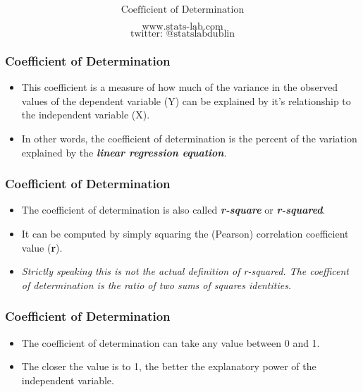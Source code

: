 \documentclass{beamer}
\begin{document}
\begin{frame}

{
\Huge
\[\mbox{Coefficient of Determination} \]
}
{
\Large

\[\mbox{www.stats-lab.com} \]
\[ \mbox{twitter: @statslabdublin} \] 

}
\end{frame}


\begin{frame}
\frametitle{Coefficient of Determination}
\LARGE
\vspace{-1cm}
\begin{itemize}
\item
This coefficient is a measure of how much of the variance in the observed values of the dependent variable (Y) can be explained by it's relationship to the independent variable (X).
\item In other words, the coefficient of determination is the percent of the variation explained by the \textbf{\textit{linear regression equation}}.
\end{itemize}
\end{frame}
\begin{frame}
\frametitle{Coefficient of Determination}
\LARGE
\vspace{-1cm}
\begin{itemize}
\item
The coefficient of determination is also called \textbf{\textit{r-square}} or \textbf{\textit{r-squared}}. 
\item It can be computed by simply squaring the (Pearson) correlation coefficient value (\textbf{r}).
\item \textit{Strictly speaking this is not the actual definition of r-squared. The coefficent of determination is the ratio of two sums of squares identities.}
\end{itemize}
\end{frame}
\begin{frame}
\frametitle{Coefficient of Determination}
\LARGE
\vspace{-1cm}
\begin{itemize}
\item The coefficient of determination can take any value between 0 and 1.
\item The closer the value is to 1, the better the explanatory power of the independent variable.
\end{itemize}
\end{frame}
\end{document}
